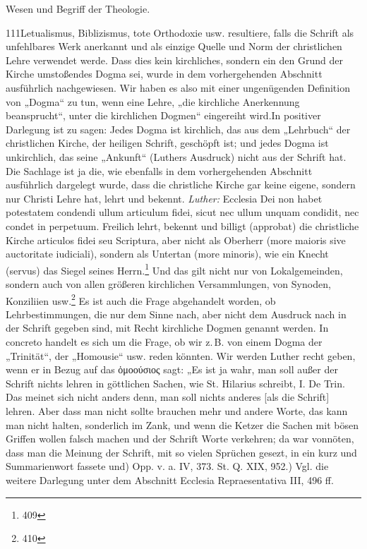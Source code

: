 \noindent\parbox[t]{0.5\textwidth}{Wesen und Begriff der Theologie.}\hfill 111\n\n\medskip\n\n\noindent Letualismus, Biblizismus, tote Orthodoxie usw. resultiere, falls die Schrift als unfehlbares Werk anerkannt und als einzige Quelle und Norm der christlichen Lehre verwendet werde. Dass dies kein kirchliches, sondern ein den Grund der Kirche umstoßendes Dogma sei, wurde in dem vorhergehenden Abschnitt ausführlich nachgewiesen. Wir haben es also mit einer ungenügenden Definition von „Dogma“ zu tun, wenn eine Lehre, „die kirchliche Anerkennung beansprucht“, unter die kirchlichen Dogmen“ eingereiht wird.\n\n\medskip\n\n\noindent In positiver Darlegung ist zu sagen: Jedes Dogma ist kirchlich, das aus dem „Lehrbuch“ der christlichen Kirche, der heiligen Schrift, geschöpft ist; und jedes Dogma ist unkirchlich, das seine „Ankunft“ (Luthers Ausdruck) nicht aus der Schrift hat. Die Sachlage ist ja die, wie ebenfalls in dem vorhergehenden Abschnitt ausführlich dargelegt wurde, dass die christliche Kirche gar keine eigene, sondern nur Christi Lehre hat, lehrt und bekennt. \textit{Luther:} Ecclesia Dei non habet potestatem condendi ullum articulum fidei, sicut nec ullum unquam condidit, nec condet in perpetuum. Freilich lehrt, bekennt und billigt (approbat) die christliche Kirche articulos fidei seu Scriptura, aber nicht als Oberherr (more maioris sive auctoritate iudiciali), sondern als Untertan (more minoris), wie ein Knecht (servus) das Siegel seines Herrn.\footnote{409} Und das gilt nicht nur von Lokalgemeinden, sondern auch von allen größeren kirchlichen Versammlungen, von Synoden, Konziliien usw.\footnote{410} Es ist auch die Frage abgehandelt worden, ob Lehrbestimmungen, die nur dem Sinne nach, aber nicht dem Ausdruck nach in der Schrift gegeben sind, mit Recht kirchliche Dogmen genannt werden. In concreto handelt es sich um die Frage, ob wir z.\,B. von einem Dogma der „Trinität“, der „Homousie“ usw. reden könnten. Wir werden Luther recht geben, wenn er in Bezug auf das \foreignlanguage{greek}{ὁμοούσιος} sagt: „Es ist ja wahr, man soll außer der Schrift nichts lehren in göttlichen Sachen, wie St. Hilarius schreibt, I. De Trin. Das meinet sich nicht anders denn, man soll nichts anderes [als die Schrift] lehren. Aber dass man nicht sollte brauchen mehr und andere Worte, das kann man nicht halten, sonderlich im Zank, und wenn die Ketzer die Sachen mit bösen Griffen wollen falsch machen und der Schrift Worte verkehren; da war vonnöten, dass man die Meinung der Schrift, mit so vielen Sprüchen gesezt, in ein kurz und Summarienwort fassete und\n\n\vfill\n\footnotesize\n{}) Opp. v. a. IV, 373. St. Q. XIX, 952.\n{}) Vgl. die weitere Darlegung unter dem Abschnitt Ecclesia Repraesentativa III, 496 ff.